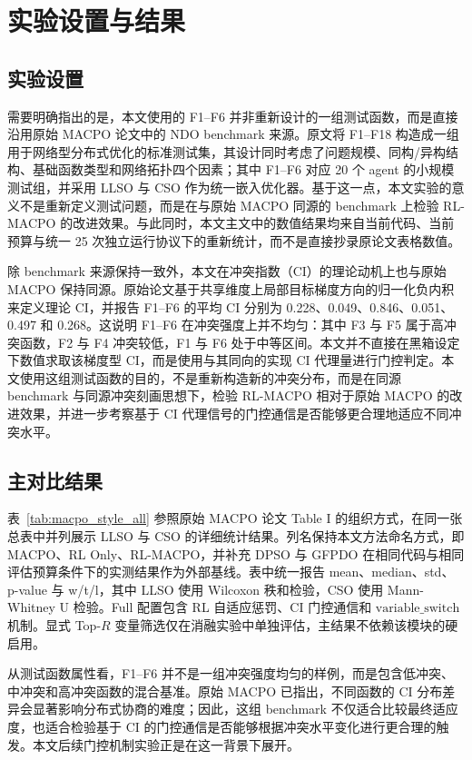 \documentclass[conference]{IEEEtran}
\begin{document}
\section{实验设置与结果}\label{sec:experiments}

\subsection{实验设置}
需要明确指出的是，本文使用的 F1--F6 并非重新设计的一组测试函数，而是直接沿用原始 MACPO 论文中的 NDO benchmark 来源。原文将 F1--F18 构造成一组用于网络型分布式优化的标准测试集，其设计同时考虑了问题规模、同构/异构结构、基础函数类型和网络拓扑四个因素；其中 F1--F6 对应 20 个 agent 的小规模测试组，并采用 LLSO 与 CSO 作为统一嵌入优化器。基于这一点，本文实验的意义不是重新定义测试问题，而是在与原始 MACPO 同源的 benchmark 上检验 RL-MACPO 的改进效果。与此同时，本文主文中的数值结果均来自当前代码、当前预算与统一 25 次独立运行协议下的重新统计，而不是直接抄录原论文表格数值。

除 benchmark 来源保持一致外，本文在冲突指数（CI）的理论动机上也与原始 MACPO 保持同源。原始论文基于共享维度上局部目标梯度方向的归一化负内积来定义理论 CI，并报告 F1--F6 的平均 CI 分别为 0.228、0.049、0.846、0.051、0.497 和 0.268。这说明 F1--F6 在冲突强度上并不均匀：其中 F3 与 F5 属于高冲突函数，F2 与 F4 冲突较低，F1 与 F6 处于中等区间。本文并不直接在黑箱设定下数值求取该梯度型 CI，而是使用与其同向的实现 CI 代理量进行门控判定。本文使用这组测试函数的目的，不是重新构造新的冲突分布，而是在同源 benchmark 与同源冲突刻画思想下，检验 RL-MACPO 相对于原始 MACPO 的改进效果，并进一步考察基于 CI 代理信号的门控通信是否能够更合理地适应不同冲突水平。
\subsection{主对比结果}

表~\ref{tab:macpo_style_all} 参照原始 MACPO 论文 Table I 的组织方式，在同一张总表中并列展示 LLSO 与 CSO 的详细统计结果。列名保持本文方法命名方式，即 MACPO、RL Only、RL-MACPO，并补充 DPSO 与 GFPDO 在相同代码与相同评估预算条件下的实测结果作为外部基线。表中统一报告 mean、median、std、p-value 与 w/t/l，其中 LLSO 使用 Wilcoxon 秩和检验，CSO 使用 Mann-Whitney U 检验。Full 配置包含 RL 自适应惩罚、CI 门控通信和 $\mathrm{variable\_switch}$ 机制。显式 Top-$R$ 变量筛选仅在消融实验中单独评估，主结果不依赖该模块的硬启用。

从测试函数属性看，F1--F6 并不是一组冲突强度均匀的样例，而是包含低冲突、中冲突和高冲突函数的混合基准。原始 MACPO 已指出，不同函数的 CI 分布差异会显著影响分布式协商的难度；因此，这组 benchmark 不仅适合比较最终适应度，也适合检验基于 CI 的门控通信是否能够根据冲突水平变化进行更合理的触发。本文后续门控机制实验正是在这一背景下展开。
\end{document}
